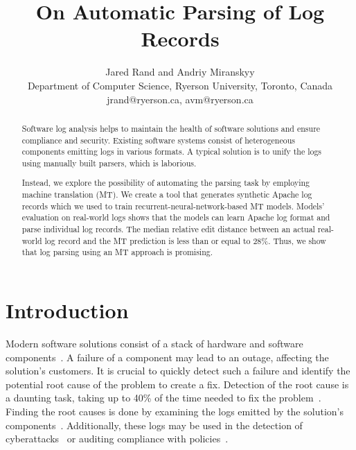 \documentclass{article}
\begin{document}
\title{On Automatic Parsing of Log Records}

\author{ Jared Rand and Andriy Miranskyy \\
Department of Computer Science, Ryerson University, Toronto, Canada \\
jrand@ryerson.ca, avm@ryerson.ca
}
\date{}

\maketitle

\begin{abstract}
Software log analysis helps to maintain the health of software solutions and ensure compliance and security. Existing software systems consist of heterogeneous components emitting logs in various formats. A typical solution is to unify the logs using manually built parsers, which is laborious.

Instead, we explore the possibility of automating the parsing task by employing machine translation (MT). We create a tool that generates synthetic Apache log records which we used to train recurrent-neural-network-based MT models. Models' evaluation on real-world logs shows that the models can learn Apache log format and parse individual log records. The median relative edit distance between an actual real-world log record and the MT prediction is less than or equal to 28\%. Thus, we show that log parsing using an MT approach is promising.

\end{abstract}

\section{Introduction}
Modern software solutions consist of a stack of hardware and software components~\cite{DBLP:conf/acsac/YenOOLRJK13,DBLP:journals/software/MiranskyyHCL16}. A failure of a component may lead to an outage, affecting the solution’s customers. It is crucial to quickly detect such a failure and identify the potential root cause of the problem to create a fix. Detection of the root cause is a daunting task, taking up to 40\% of the time needed to fix the problem~\cite{DBLP:journals/jss/MurtazaHMG14}. Finding the root causes is done by examining the logs emitted by the solution’s components~\cite{DBLP:journals/jss/MurtazaHMG14,DBLP:conf/sigsoft/MiranskyyMGDWG07,DBLP:conf/icse/BeschastnikhBEK14,DBLP:journals/tse/MarianiPS17}. 
Additionally, these logs may be used in the detection of cyberattacks~\cite{DBLP:conf/acsac/YenOOLRJK13} or auditing compliance with policies~\cite{DBLP:conf/acsac/YenOOLRJK13,DBLP:conf/IEEEares/DernaikaCCR19}.
\end{document}
